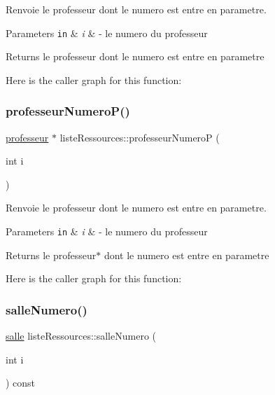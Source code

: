 Renvoie le professeur dont le numero est entre en parametre. 


\begin{DoxyParams}[1]{Parameters}
\mbox{\tt in}  & {\em i} & -\/ le numero du professeur \\
\hline
\end{DoxyParams}
\begin{DoxyReturn}{Returns}
le professeur dont le numero est entre en parametre 
\end{DoxyReturn}
Here is the caller graph for this function\+:
\hypertarget{classliste_ressources_a48e60720782a54d95bbc708cac235951}{}\label{classliste_ressources_a48e60720782a54d95bbc708cac235951} 
\subsubsection{\texorpdfstring{professeur\+Numero\+P()}{professeurNumeroP()}}
{\footnotesize\ttfamily \hyperlink{classprofesseur}{professeur} $\ast$ liste\+Ressources\+::professeur\+NumeroP (\begin{DoxyParamCaption}\item[{int}]{i }\end{DoxyParamCaption})}



Renvoie le professeur dont le numero est entre en parametre. 


\begin{DoxyParams}[1]{Parameters}
\mbox{\tt in}  & {\em i} & -\/ le numero du professeur \\
\hline
\end{DoxyParams}
\begin{DoxyReturn}{Returns}
le professeur$\ast$ dont le numero est entre en parametre 
\end{DoxyReturn}
Here is the caller graph for this function\+:
\hypertarget{classliste_ressources_ae49f2ce49be854dda108840fd3d26112}{}\label{classliste_ressources_ae49f2ce49be854dda108840fd3d26112} 
\subsubsection{\texorpdfstring{salle\+Numero()}{salleNumero()}}
{\footnotesize\ttfamily \hyperlink{classsalle}{salle} liste\+Ressources\+::salle\+Numero (\begin{DoxyParamCaption}\item[{int}]{i }\end{DoxyParamCaption}) const}



